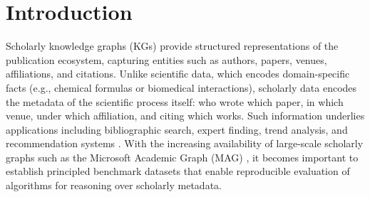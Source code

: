 \documentclass[conference]{IEEEtran}
\begin{document}
%
%
%


\section{Introduction}

Scholarly knowledge graphs (KGs) provide structured representations of the publication ecosystem, capturing entities such as authors, papers, venues, affiliations, and citations. Unlike scientific data, which encodes domain-specific facts (e.g., chemical formulas or biomedical interactions), scholarly data encodes the metadata of the scientific process itself: who wrote which paper, in which venue, under which affiliation, and citing which works. Such information underlies applications including bibliographic search, expert finding, trend analysis, and recommendation systems \cite{sinha_overviewmicrosoftacademic_2015, wang_microsoftacademicgraph_2020}. With the increasing availability of large-scale scholarly graphs such as the Microsoft Academic Graph (MAG) \cite{wang_microsoftacademicgraph_2020}, it becomes important to establish principled benchmark datasets that enable reproducible evaluation of algorithms for reasoning over scholarly metadata.
\end{document}
